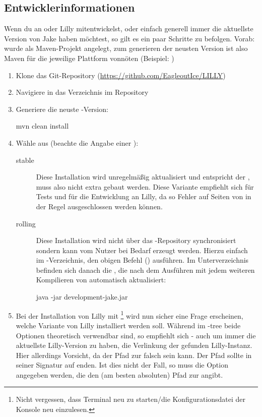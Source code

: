 \subsection{Entwicklerinformationen}
Wenn du an \Jake oder Lilly mitentwickelst, oder einfach generell immer die aktuellste Version von Jake haben möchtest, so gilt es ein paar Schritte zu befolgen. Vorab: \Jake wurde als Maven-Projekt angelegt, zum generieren der neusten Version ist also Maven für die jeweilige Plattform vonnöten (Beispiel: )
\begin{enumerate}\narrowitems
    \item Klone das Git-Repository (\url{https://github.com/EagleoutIce/LILLY})
    \item Navigiere in das Verzeichnis  im Repository
    \item Generiere die neuste \Jake-Version: \begin{bash*}
mvn clean install
        \end{bash*}
    \item Wähle aus (beachte die Angabe einer ): \begin{description}
        \item[stable] Diese Installation wird unregelmäßig aktualisiert und entspricht der , muss also nicht extra gebaut werden. Diese Variante empfiehlt sich für Tests und für die Entwicklung an Lilly, da so Fehler auf Seiten von \Jake in der Regel ausgeschlossen werden können.
        \item[rolling] Diese Installation wird nicht über das -Repository synchronisiert sondern kann vom Nutzer bei Bedarf erzeugt werden. Hierzu einfach im -Verzeichnis, den obigen Befehl () ausführen. Im Unterverzeichnis  befinden sich danach die , die nach dem Ausführen mit jedem weiteren Kompilieren von \Jake automatisch aktualisiert: \begin{bash*}
java -jar development-jake.jar
        \end{bash*}
    \end{description}
    \item Bei der Installation von Lilly mit \footnote{Nicht vergessen, dass Terminal neu zu starten/die Konfigurationsdatei der Konsole neu einzulesen.} wird nun sicher eine Frage erscheinen, welche Variante von Lilly installiert werden soll. Während im -tree beide Optionen theoretisch verwendbar sind, so empfiehlt sich - auch um immer die aktuellste Lilly-Version zu haben, die Verlinkung der gefunden Lilly-Instanz. Hier allerdings Vorsicht, da der Pfad zur  falsch sein kann. Der Pfad sollte in seiner Signatur auf  enden. Ist dies nicht der Fall, so muss die Option  angegeben werden, die den (am besten absoluten) Pfad zur  angibt.
\end{enumerate}

